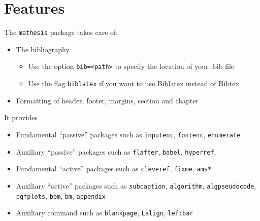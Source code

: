 \section{Features}

The \verb|mathesis| package takes care of:
\begin{itemize}
	\item The bibliography
	\begin{itemize}
		\item Use the option \verb|bib=<path>| to specify the location of your .bib file
		\item Use the flag \verb|biblatex| if you want to use Biblatex instead of  Bibtex.
	\end{itemize}
	\item Formatting of header, footer, margins, section and chapter	
\end{itemize}
It provides
\begin{itemize}
	\item Fundamental ``passive'' packages such as \verb|inputenc|, \verb|fontenc|, \verb|enumerate|
	\item Auxiliary ``passive'' packages such as \verb|flafter|, \verb|babel|, \verb|hyperref|,
	\item Fundamental ``active'' packages such as \verb|cleveref|, \verb|fixme|, \verb|ams*|
	\item Auxiliary ``active'' packages such as \verb|subcaption|, \verb|algorithm|, \verb|algpseudocode|, \verb|pgfplots|, \verb|bbm|, \verb|bm|, \verb|appendix|
	\item Auxiliary command such as \verb|blankpage|, \verb|Lalign|, \verb|leftbar|
\end{itemize}